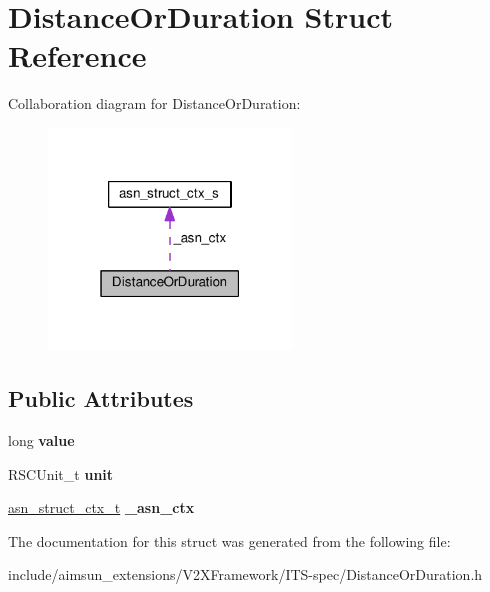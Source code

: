 \hypertarget{structDistanceOrDuration}{}\section{Distance\+Or\+Duration Struct Reference}
\label{structDistanceOrDuration}


Collaboration diagram for Distance\+Or\+Duration\+:\nopagebreak
\begin{figure}[H]
\begin{center}
\leavevmode
\includegraphics[width=183pt]{structDistanceOrDuration__coll__graph}
\end{center}
\end{figure}
\subsection*{Public Attributes}
\begin{DoxyCompactItemize}
\item 
long {\bfseries value}\hypertarget{structDistanceOrDuration_ad2ac35b9e856cf6dc02c07d7cbc35fb6}{}\label{structDistanceOrDuration_ad2ac35b9e856cf6dc02c07d7cbc35fb6}

\item 
R\+S\+C\+Unit\+\_\+t {\bfseries unit}\hypertarget{structDistanceOrDuration_ad97285bc473f82f0d07d6c7cd0ce8d4b}{}\label{structDistanceOrDuration_ad97285bc473f82f0d07d6c7cd0ce8d4b}

\item 
\hyperlink{structasn__struct__ctx__s}{asn\+\_\+struct\+\_\+ctx\+\_\+t} {\bfseries \+\_\+asn\+\_\+ctx}\hypertarget{structDistanceOrDuration_a6569c5df8876945a4a03149564719015}{}\label{structDistanceOrDuration_a6569c5df8876945a4a03149564719015}

\end{DoxyCompactItemize}


The documentation for this struct was generated from the following file\+:\begin{DoxyCompactItemize}
\item 
include/aimsun\+\_\+extensions/\+V2\+X\+Framework/\+I\+T\+S-\/spec/Distance\+Or\+Duration.\+h\end{DoxyCompactItemize}
